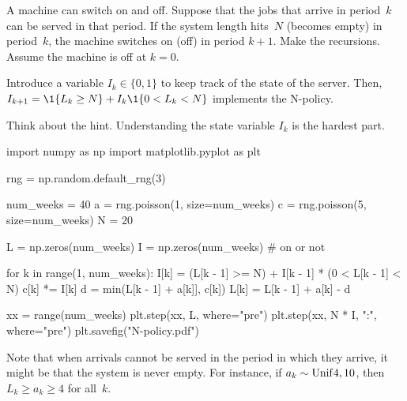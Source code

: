 \documentclass[stochastic-or.tex]{subfiles}
\begin{document}


\begin{exercise}\label{ex:n-policies}
A machine 
can switch on and off.
Suppose that the jobs that arrive in period~$k$ can be served in that period.
If the system length hits~$N$ (becomes empty) in period~$k$, the machine switches on (off) in period $k+1$.
Make the recursions.
Assume the machine is off at $k=0$.
\begin{hint}
  Introduce a variable $I_k\in\{0, 1\}$ to keep track of the state of the server.
  Then, $I_{k+1} = \1{\L_k\geq N} + I_k \1{0<\L_k<N}$ implements the N-policy.
\end{hint}
\begin{solution}
Think about the hint. Understanding the state variable $I_{k}$ is the hardest part.
\begin{python}
import numpy as np
import matplotlib.pyplot as plt


rng = np.random.default_rng(3)

num_weeks = 40
a = rng.poisson(1, size=num_weeks)
c = rng.poisson(5, size=num_weeks)
N = 20

L = np.zeros(num_weeks)
I = np.zeros(num_weeks)  # on or not

for k in range(1, num_weeks):
    I[k] = (L[k - 1] >= N) + I[k - 1] * (0 < L[k - 1] < N)
    c[k] *= I[k]
    d = min(L[k - 1] + a[k]], c[k])
    L[k] = L[k - 1] + a[k] - d


xx = range(num_weeks)
plt.step(xx, L, where="pre")
plt.step(xx, N * I, ":", where="pre")
plt.savefig("N-policy.pdf")
\end{python}
Note that when arrivals cannot be served in the period in which they arrive, it might be that the system is never empty.
For instance, if $a_{k}\sim\mathrm{Unif}4, 10$, then $L_{k}\geq a_{k} \geq 4$ for all~$k$.
\end{solution}
\end{exercise}
\end{document}
